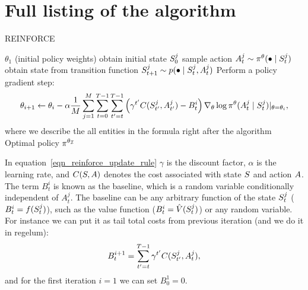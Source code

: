 \documentclass[12pt,twoside]{../../mitthesis}
\begin{document}
\section*{Full listing of the algorithm}
\begin{algorithm}
    \caption{REINFORCE}
    \label{alg:my-alg}
    \begin{algorithmic}
     $\theta_1$ (initial policy weights)
            \STATE obtain initial state $S_0^{j}$
                \STATE sample action $A_t^j \sim \pi^{\theta}(\bullet \mid S_t^{j})$
                \STATE obtain state from transition function $S_{t+1}^j \sim p(\bullet \mid S_t^j, A_t^j)$
            \ENDFOR
        \ENDFOR
        \STATE  Perform a policy gradient step:
        \begin{equation}
        \label{eqn_reinforce_update_rule}
            \theta_{i+1} \leftarrow \theta_i - \alpha \frac{1}{M}\sum_{j = 1}^M \sum_{t = 0}^{T-1}\sum_{t'=t}^{T-1}\left( \gamma^{t'} C(S_{t'}^j, A_{t'}^j) - B_{t}^i\right) \nabla_{\theta}\log \pi^{\theta}(A_t^j \mid S_t^j)\rvert_{\theta = \theta_i},
        \end{equation}
        \STATE where we describe the all entities in the formula right after the algorithm
    \ENDFOR
    \STATE \RETURN Optimal policy $\pi^{\theta_{\mathcal I}}$
    \end{algorithmic}
\end{algorithm}

In equation~\eqref{eqn_reinforce_update_rule} $\gamma$ is the discount factor, $\alpha$ is the learning rate, and $C(S, A)$ denotes the cost associated with state $S$ and action $A$. The term $B_t^i$ is known as the baseline, which is a random variable conditionally independent of $A_t^j$. The baseline can be any arbitrary function of the state $S_t^j$ ($B_t^i = f(S_t^j)$), such as the value function ($B_t^i = \hat{V}(S_t^j)$) or any random variable. 
        For instance we can put it as tail total costs from previous iteration (and we do it in regelum):
        $$
            B_t^{i + 1} = \sum_{t'=t}^{T-1}\gamma^{t'} C(S_{t'}^j, A_t^j), 
        $$
        and for the first iteration $i = 1$ we can set $B_0^1 = 0$.
\end{document}
